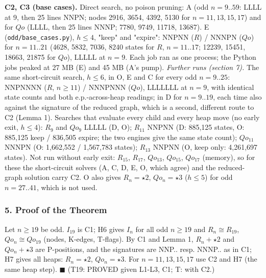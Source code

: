 \textbf{C2, C3 (base cases).} Direct search, no poison pruning: A (odd $n=9..59$: LLLL at 9, then 25 lines NNPN; nodes 2916, 3654, 4392, 5130 for $n=11,13,15,17$) and for $Qo$ (LLLL, then 25 lines NNNP; 7780, 9749, 11718, 13687). E (\texttt{odd/base\_cases.py}), $h\le4$, "keep" and "expire": NNPNN ($R$) / NNNPN ($Qo$) for $n=11..21$ (4628, 5832, 7036, 8240 states for $R$, $n=11..17$; 12239, 15451, 18663, 21875 for $Qo$), LLLLL at $n=9$. Each job ran as one process; the Python jobs peaked at 27 MB (E) and 45 MB (A's pump). \emph{Further runs (section 7).} The same short-circuit search, $h\le6$, in O, E and C for every odd $n=9..25$: NNPNNNN ($R$, $n\ge11$) / NNNPNNN ($Qo$), LLLLLLL at $n=9$, with identical state counts and both e.p.-across-heap readings; in D for $n=9..19$, each time also against the signature of the reduced graph, which is a second, different route to C2 (Lemma 1). Searches that evaluate every child and every heap move (no early exit, $h\le4$): $R_9$ and $Qo_9$ LLLLL (D, O); $R_{11}$ NNPNN (D: 885,125 states, O: 885,125 keep / 836,505 expire; the two engines give the same state count); $Qo_{11}$ NNNPN (O: 1,662,552 / 1,567,783 states); $R_{13}$ NNPNN (O, keep only: 4,261,697 states). Not run without early exit: $R_{15}$, $R_{17}$, $Qo_{13}$, $Qo_{15}$, $Qo_{17}$ (memory), so for these the short-circuit solvers (A, C, D, E, O, which agree) and the reduced-graph solution carry C2. O also gives $R_n=\star2$, $Qo_n=\star3$ ($h\le5$) for odd $n=27..41$, which is not used.

\subsubsection*{5. Proof of the Theorem}
Let $n\ge19$ be odd. $I_{19}$ is C1; H6 gives $I_n$ for all odd $n\ge19$ and $R_n\cong R_{19}$, $Qo_n\cong Qo_{19}$ (nodes, K-edges, T-flags). By C1 and Lemma 1, $R_n+\star2$ and $Qo_n+\star3$ are P-positions, and the signatures are NNP.. resp. NNNP.. as in C1; H7 gives all heaps: $R_n=\star2$, $Qo_n=\star3$. For $n=11,13,15,17$ use C2 and H7 (the same heap step). $\blacksquare$ (T19: PROVED given L1-L3, C1; T: with C2.)

